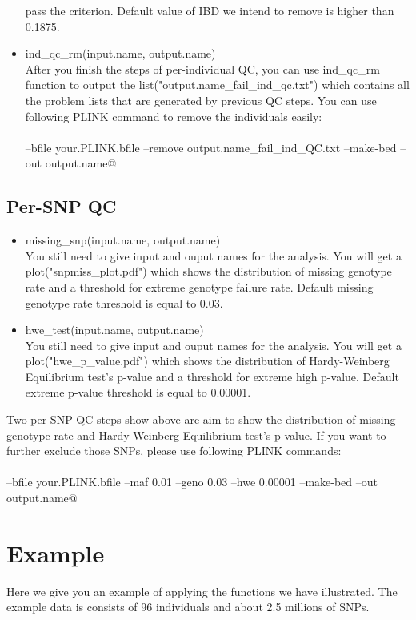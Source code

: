 \documentclass{article}
\begin{document}
\begin{itemize}
    pass the criterion. Default value of IBD we intend to remove is higher than 0.1875.
    \item ind\_qc\_rm(input.name, output.name) \\
    After you finish the steps of per-individual QC, you can use ind\_qc\_rm function to output the list("output.name\_fail\_ind\_qc.txt") which contains 
    all the problem lists that are generated by previous QC steps. You can use following PLINK command to remove the individuals easily:\\
    \\\verb@plink --bfile your.PLINK.bfile --remove output.name_fail_ind_QC.txt --make-bed --out output.name@
\end{itemize}
\subsection{Per-SNP QC}
\begin{itemize}
    \item missing\_snp(input.name, output.name) \\
    You still need to give input and ouput names for the analysis. You will get a plot("snpmiss\_plot.pdf") which shows the distribution of 
    missing genotype rate and a threshold for extreme genotype failure rate. Default missing genotype rate threshold is equal to 0.03.
    \item hwe\_test(input.name, output.name) \\
    You still need to give input and ouput names for the analysis. You will get a plot("hwe\_p\_value.pdf") which shows the distribution of 
    Hardy-Weinberg Equilibrium test's p-value and a threshold for extreme high p-value. Default extreme p-value threshold is equal to 0.00001.
\end{itemize}
Two per-SNP QC steps show above are aim to show the distribution of missing genotype rate and Hardy-Weinberg Equilibrium test's p-value. If you want to 
further exclude those SNPs, please use following PLINK commands:\\
\\\verb@plink --bfile your.PLINK.bfile --maf 0.01 --geno 0.03 --hwe 0.00001 --make-bed --out output.name@
\newpage
\section{Example}
Here we give you an example of applying the functions we have illustrated. The example data is consists of 96 individuals and about 2.5 millions of SNPs.\\
\end{document}
